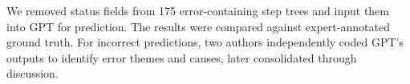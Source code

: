 We removed status fields from 175 error-containing step trees and input them into GPT for prediction. The results were compared against expert-annotated ground truth. For incorrect predictions, two authors independently coded GPT's outputs to identify error themes and causes, later consolidated through discussion.






